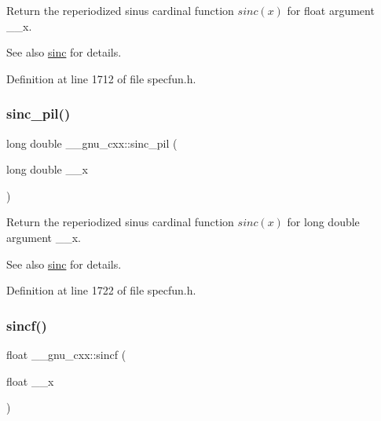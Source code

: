 Return the reperiodized sinus cardinal function $ sinc(x) $ for {\ttfamily float} argument {\ttfamily \+\_\+\+\_\+x}.

\begin{DoxySeeAlso}{See also}
\hyperlink{group__mathsf__gnu_ga09976b5d041113979c93613cc3700348}{sinc} for details. 
\end{DoxySeeAlso}


Definition at line 1712 of file specfun.\+h.

\mbox{\label{group__mathsf__gnu_gaad38a6e40b1272391a26dbb32a684b3c}} 
\subsubsection{\texorpdfstring{sinc\+\_\+pil()}{sinc\_pil()}}
{\footnotesize\ttfamily long double \+\_\+\+\_\+gnu\+\_\+cxx\+::sinc\+\_\+pil (\begin{DoxyParamCaption}\item[{long double}]{\+\_\+\+\_\+x }\end{DoxyParamCaption})\hspace{0.3cm}{\ttfamily [inline]}}

Return the reperiodized sinus cardinal function $ sinc(x) $ for {\ttfamily long double} argument {\ttfamily \+\_\+\+\_\+x}.

\begin{DoxySeeAlso}{See also}
\hyperlink{group__mathsf__gnu_ga09976b5d041113979c93613cc3700348}{sinc} for details. 
\end{DoxySeeAlso}


Definition at line 1722 of file specfun.\+h.

\mbox{\label{group__mathsf__gnu_gaa87f0734cfe7823c932511ac2f0a876c}} 
\subsubsection{\texorpdfstring{sincf()}{sincf()}}
{\footnotesize\ttfamily float \+\_\+\+\_\+gnu\+\_\+cxx\+::sincf (\begin{DoxyParamCaption}\item[{float}]{\+\_\+\+\_\+x }\end{DoxyParamCaption})\hspace{0.3cm}{\ttfamily [inline]}}

